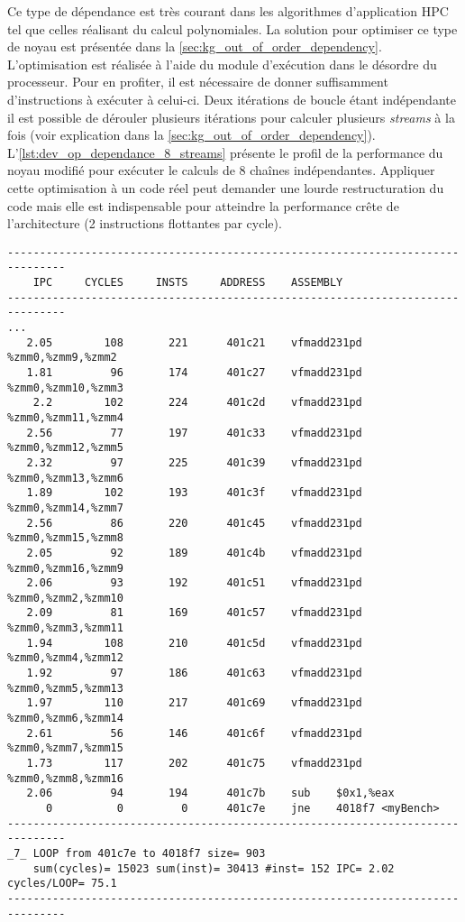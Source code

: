         Ce type de dépendance est très courant dans les algorithmes d'application HPC tel que celles réalisant du calcul polynomiales. La solution pour optimiser ce type de noyau est présentée dans la \autoref{sec:kg_out_of_order_dependency}. L'optimisation est réalisée à l'aide du module d'exécution dans le désordre du processeur. Pour en profiter, il est nécessaire de donner suffisamment d'instructions à exécuter à celui-ci. Deux itérations de boucle étant indépendante il est possible de dérouler plusieurs itérations pour calculer plusieurs \textit{streams} à la fois (voir explication dans la \autoref{sec:kg_out_of_order_dependency}). L'\autoref{lst:dev_op_dependance_8_streams} présente le profil de la performance du noyau modifié pour exécuter le calculs de 8 chaînes indépendantes. Appliquer cette optimisation à un code réel peut demander une lourde restructuration du code mais elle est indispensable pour atteindre la performance crête de l'architecture (2 instructions flottantes par cycle).
        

 \begin{lstlisting}[label=lst:dev_op_dependance_8_streams, caption=L'optimisation du noyau précedent permet de présenter au processeur 8 chaînes de calculs indépendantes.]
-------------------------------------------------------------------------------
    IPC     CYCLES     INSTS     ADDRESS    ASSEMBLY                         
-------------------------------------------------------------------------------
...
   2.05        108       221      401c21    vfmadd231pd %zmm0,%zmm9,%zmm2
   1.81         96       174      401c27    vfmadd231pd %zmm0,%zmm10,%zmm3
    2.2        102       224      401c2d    vfmadd231pd %zmm0,%zmm11,%zmm4
   2.56         77       197      401c33    vfmadd231pd %zmm0,%zmm12,%zmm5
   2.32         97       225      401c39    vfmadd231pd %zmm0,%zmm13,%zmm6
   1.89        102       193      401c3f    vfmadd231pd %zmm0,%zmm14,%zmm7
   2.56         86       220      401c45    vfmadd231pd %zmm0,%zmm15,%zmm8
   2.05         92       189      401c4b    vfmadd231pd %zmm0,%zmm16,%zmm9
   2.06         93       192      401c51    vfmadd231pd %zmm0,%zmm2,%zmm10
   2.09         81       169      401c57    vfmadd231pd %zmm0,%zmm3,%zmm11
   1.94        108       210      401c5d    vfmadd231pd %zmm0,%zmm4,%zmm12
   1.92         97       186      401c63    vfmadd231pd %zmm0,%zmm5,%zmm13
   1.97        110       217      401c69    vfmadd231pd %zmm0,%zmm6,%zmm14
   2.61         56       146      401c6f    vfmadd231pd %zmm0,%zmm7,%zmm15
   1.73        117       202      401c75    vfmadd231pd %zmm0,%zmm8,%zmm16
   2.06         94       194      401c7b    sub    $0x1,%eax
      0          0         0      401c7e    jne    4018f7 <myBench>
-------------------------------------------------------------------------------
_7_ LOOP from 401c7e to 4018f7 size= 903 
    sum(cycles)= 15023 sum(inst)= 30413 #inst= 152 IPC= 2.02 cycles/LOOP= 75.1
-------------------------------------------------------------------------------

\end{lstlisting}   




